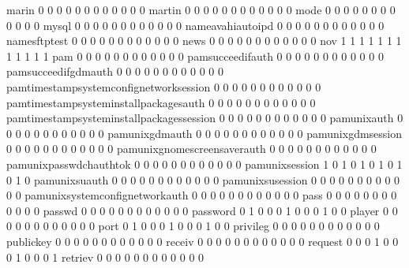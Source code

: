 \documentclass[compress,8pt]{beamer}
\begin{document}
\begin{frame}
\begin{Schunk}
  marin                                     0  0  0  0  0  0  0  0  0  0  0  0
  martin                                    0  0  0  0  0  0  0  0  0  0  0  0
  mode                                      0  0  0  0  0  0  0  0  0  0  0  0
  mysql                                     0  0  0  0  0  0  0  0  0  0  0  0
  nameavahiautoipd                          0  0  0  0  0  0  0  0  0  0  0  0
  namesftptest                              0  0  0  0  0  0  0  0  0  0  0  0
  news                                      0  0  0  0  0  0  0  0  0  0  0  0
  nov                                       1  1  1  1  1  1  1  1  1  1  1  1
  pam                                       0  0  0  0  0  0  0  0  0  0  0  0
  pamsucceedifauth                          0  0  0  0  0  0  0  0  0  0  0  0
  pamsucceedifgdmauth                       0  0  0  0  0  0  0  0  0  0  0  0
  pamtimestampsystemconfignetworksession    0  0  0  0  0  0  0  0  0  0  0  0
  pamtimestampsysteminstallpackagesauth     0  0  0  0  0  0  0  0  0  0  0  0
  pamtimestampsysteminstallpackagessession  0  0  0  0  0  0  0  0  0  0  0  0
  pamunixauth                               0  0  0  0  0  0  0  0  0  0  0  0
  pamunixgdmauth                            0  0  0  0  0  0  0  0  0  0  0  0
  pamunixgdmsession                         0  0  0  0  0  0  0  0  0  0  0  0
  pamunixgnomescreensaverauth               0  0  0  0  0  0  0  0  0  0  0  0
  pamunixpasswdchauthtok                    0  0  0  0  0  0  0  0  0  0  0  0
  pamunixsession                            1  0  1  0  1  0  1  0  1  0  1  0
  pamunixsuauth                             0  0  0  0  0  0  0  0  0  0  0  0
  pamunixsusession                          0  0  0  0  0  0  0  0  0  0  0  0
  pamunixsystemconfignetworkauth            0  0  0  0  0  0  0  0  0  0  0  0
  pass                                      0  0  0  0  0  0  0  0  0  0  0  0
  passwd                                    0  0  0  0  0  0  0  0  0  0  0  0
  password                                  0  1  0  0  0  1  0  0  0  1  0  0
  player                                    0  0  0  0  0  0  0  0  0  0  0  0
  port                                      0  1  0  0  0  1  0  0  0  1  0  0
  privileg                                  0  0  0  0  0  0  0  0  0  0  0  0
  publickey                                 0  0  0  0  0  0  0  0  0  0  0  0
  receiv                                    0  0  0  0  0  0  0  0  0  0  0  0
  request                                   0  0  0  1  0  0  0  1  0  0  0  1
  retriev                                   0  0  0  0  0  0  0  0  0  0  0  0

\end{Schunk}
\end{frame}
\end{document}
